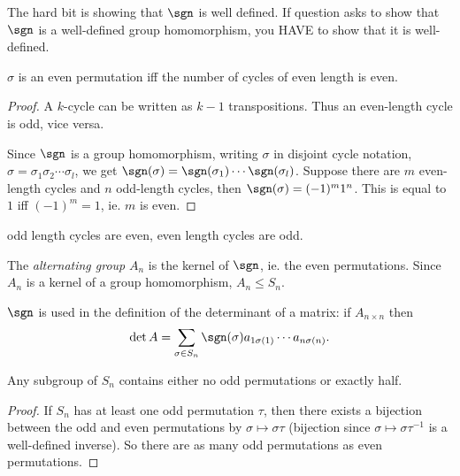 \documentclass[a4paper]{article}
\begin{document}
\note The hard bit is showing that $\sgn$ is well defined. If question asks to show that $\sgn$ is a well-defined group homomorphism, you HAVE to show that it is well-defined.

\begin{lemma}
  $\sigma$ is an even permutation iff the number of cycles of even length is even.
\end{lemma}

\begin{proof}
  A $k$-cycle can be written as $k - 1$ transpositions. Thus an even-length cycle is odd, vice versa.

  Since $\sgn$ is a group homomorphism, writing $\sigma$ in disjoint cycle notation, $\sigma = \sigma_1\sigma_2\cdots\sigma_l$, we get $\sgn(\sigma) = \sgn(\sigma_1)\cdots \sgn(\sigma_l)$. Suppose there are $m$ even-length cycles and $n$ odd-length cycles, then $\sgn(\sigma) = (-1)^m 1^n$. This is equal to $1$ iff $(-1)^m = 1$, ie. $m$ is even.
\end{proof}
\note odd length cycles are even, even length cycles are odd.

\begin{defi}
  The \emph{alternating group} $A_n$ is the kernel of $\sgn$, ie. the even permutations.
  Since $A_n$ is a kernel of a group homomorphism, $A_n \leq S_n$.
\end{defi}
\note $\sgn$ is used in the definition of the determinant of a matrix: if $A_{n\times n}$ then
\[
  \det A = \sum_{\sigma\in S_n}\sgn(\sigma) a_{1\sigma(1)}\cdots a_{n\sigma(n)}.
\]

\begin{prop}
  Any subgroup of $S_n$ contains either no odd permutations or exactly half.
\end{prop}

\begin{proof}
  If $S_n$ has at least one odd permutation $\tau$, then there exists a bijection between the odd and even permutations by $\sigma \mapsto \sigma\tau$ (bijection since $\sigma \mapsto \sigma \tau^{-1}$ is a well-defined inverse). So there are as many odd permutations as even permutations.
\end{proof}
\end{document}
